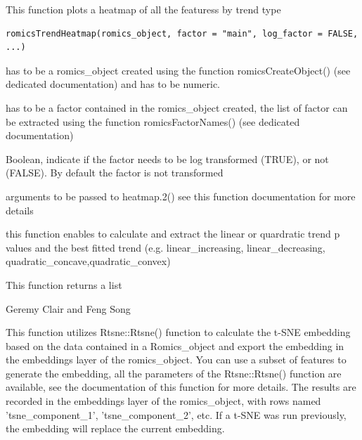 \documentclass[a4paper]{book}
\begin{document}
%
\begin{Description}
This function plots a heatmap of all the featuress by trend type
\end{Description}
%
\begin{Usage}
\begin{verbatim}
romicsTrendHeatmap(romics_object, factor = "main", log_factor = FALSE, ...)
\end{verbatim}
\end{Usage}
%
\begin{Arguments}
\begin{ldescription}
\item[\code{romics\_object}] has to be a romics\_object created using the function romicsCreateObject() (see dedicated documentation) and has to be numeric.

\item[\code{factor}] has to be a factor contained in the romics\_object created, the list of factor can be extracted using the function romicsFactorNames() (see dedicated documentation)

\item[\code{log\_factor}] Boolean, indicate if the factor needs to be log transformed (TRUE), or not (FALSE). By default the factor is not transformed

\item[\code{...}] arguments to be passed to heatmap.2() see this function documentation for more details
\end{ldescription}
\end{Arguments}
%
\begin{Details}
this function enables to calculate and extract the linear or quardratic trend p values and the best fitted trend (e.g. linear\_increasing, linear\_decreasing, quadratic\_concave,quadratic\_convex)
\end{Details}
%
\begin{Value}
This function returns a list
\end{Value}
%
\begin{Author}
Geremy Clair and Feng Song
\end{Author}
%
\begin{Description}
This function utilizes Rtsne::Rtsne() function to calculate the t-SNE embedding based on the data contained in a Romics\_object and export the embedding in the embeddings layer of the romics\_object.
You can use a subset of features to generate the embedding, all the parameters of the Rtsne::Rtsne() function are available, see the documentation of this function for more details.
The results are recorded in the embeddings layer of the romics\_object, with rows named 'tsne\_component\_1', 'tsne\_component\_2', etc.
If a t-SNE was run previously, the embedding will replace the current embedding.
\end{Description}
\end{document}
